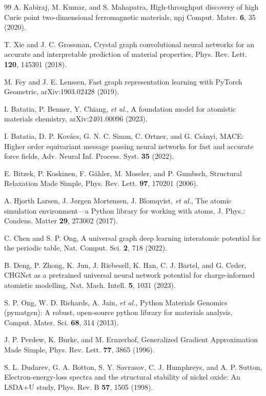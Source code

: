\documentclass[aps,prb,preprint,superscriptaddress,longbibliography,nofootinbib]{revtex4-2}
\begin{document}
\begin{thebibliography}{99}
 A. Kabiraj, M. Kumar, and S. Mahapatra, High-throughput discovery of high Curie point two-dimensional ferromagnetic materials, npj Comput. Mater. \textbf{6}, 35 (2020).

 T. Xie and J. C. Grossman, Crystal graph convolutional neural networks for an accurate and
interpretable prediction of material properties, Phys. Rev. Lett. \textbf{120}, 145301 (2018).

 M. Fey and J. E. Lenssen, Fast graph representation learning with PyTorch Geometric,
arXiv:1903.02428 (2019).

 I. Batatia, P. Benner, Y. Chiang, \emph{et al.}, A foundation model for atomistic
materials chemistry, arXiv:2401.00096 (2023).

 I. Batatia, D. P. Kov\'acs, G. N. C. Simm, C. Ortner, and G. Cs\'anyi, MACE: Higher
order equivariant message passing neural networks for fast and accurate force fields, Adv. Neural Inf.
Process. Syst. \textbf{35} (2022).

 E. Bitzek, P. Koskinen, F. G\"ahler, M. Moseler, and P. Gumbsch, Structural Relaxation Made Simple, Phys. Rev. Lett. \textbf{97}, 170201 (2006).

 A. Hjorth Larsen, J. J\o{}rgen Mortensen, J. Blomqvist, \emph{et al.}, The atomic simulation environment---a Python library for working with atoms, J. Phys.: Condens. Matter \textbf{29}, 273002 (2017).

 C. Chen and S. P. Ong, A universal graph deep learning interatomic potential for the periodic table, Nat. Comput. Sci. \textbf{2}, 718 (2022).

 B. Deng, P. Zhong, K. Jun, J. Riebesell, K. Han, C. J. Bartel, and G. Ceder, CHGNet as a pretrained universal neural network potential for charge-informed atomistic modelling, Nat. Mach. Intell. \textbf{5}, 1031 (2023).

 S. P. Ong, W. D. Richards, A. Jain, \emph{et al.}, Python Materials Genomics (pymatgen): A robust, open-source python library for materials analysis, Comput. Mater. Sci. \textbf{68}, 314 (2013).

 J. P. Perdew, K. Burke, and M. Ernzerhof, Generalized Gradient Approximation Made Simple, Phys. Rev. Lett. \textbf{77}, 3865 (1996).

 S. L. Dudarev, G. A. Botton, S. Y. Savrasov, C. J. Humphreys, and A. P. Sutton, Electron-energy-loss spectra and the structural stability of nickel oxide: An LSDA+U study, Phys. Rev. B \textbf{57}, 1505 (1998).


\end{thebibliography}
\end{document}
